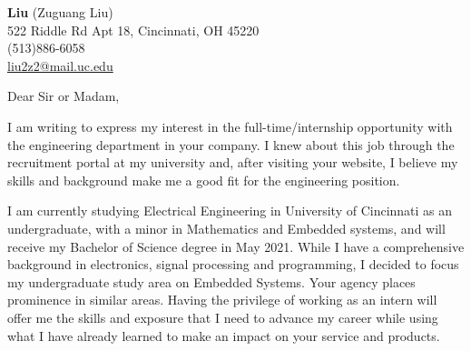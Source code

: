 \documentclass[11pt]{letter} %
\begin{document}

\begin{letter}
{\vspace{-15pt}} 


\begin{center}
\large \textbf{Liu} (Zuguang Liu) \\ %
522 Riddle Rd Apt 18, Cincinnati, OH 45220 \\ (513)886-6058  \\ \href{mailto:liu2z2@mail.uc.edu}{liu2z2@mail.uc.edu}%
\end{center} 


\signature{Liu (Zuguang Liu)} %


\opening{Dear Sir or Madam,} 
 
I am writing to express my interest in the full-time/internship opportunity with the engineering department in your company. I knew about this job through the recruitment portal at my university and, after visiting your website, I believe my skills and background make me a good fit for the engineering position.  

I am currently studying Electrical Engineering in University of Cincinnati as an undergraduate, with a minor in Mathematics and Embedded systems, and will receive my Bachelor of Science degree in May 2021. While I have a comprehensive background in electronics, signal processing and programming, I decided to focus my undergraduate study area on Embedded Systems. Your agency places prominence in similar areas. Having the privilege of working as an intern will offer me the skills and exposure that I need to advance my career while using what I have already learned to make an impact on your service and products. 


\end{letter}
\end{document}
